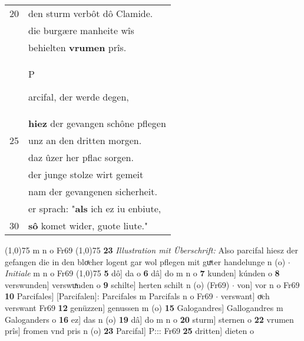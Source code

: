 \documentclass[8pt,a4paper,notitlepage]{article}
\begin{document}
\begin{table}[ht]
\begin{minipage}[t]{0.5\linewidth}
\begin{tabular}{rl}
20 & den sturm verbôt dô Clamide.\\ 
 & die burgære manheite wîs\\ 
 & behielten \textbf{vrumen} prîs.\\ 
 & \begin{large}P\end{large}arcifal, der werde degen,\\ 
 & \textbf{hiez} der gevangen schône pflegen\\ 
25 & unz an den dritten morgen.\\ 
 & daz ûzer her pflac sorgen.\\ 
 & der junge stolze wirt gemeit\\ 
 & nam der gevangenen sicherheit.\\ 
 & er sprach: "\textbf{als} ich ez iu enbiute,\\ 
30 & \textbf{sô} komet wider, guote liute."\\ 
\end{tabular}
\scriptsize
\line(1,0){75} \newline
m n o Fr69 \newline
\line(1,0){75} \newline
\textbf{23} \textit{Illustration mit Überschrift:} Also parcifal hiesz der gefangen die in den bloͯcher logent gar wol pflegen mit guͯter handelunge n (o)   $\cdot$ \textit{Initiale} m n o Fr69  \newline
\line(1,0){75} \newline
\textbf{5} dô] da o \textbf{6} dâ] do m n o \textbf{7} kunden] kúnden o \textbf{8} verswunden] verswuͯnden o \textbf{9} schilte] herten schilt n (o) (Fr69)  $\cdot$ von] vor n o Fr69 \textbf{10} Parcifales] [Parcifalen]: Parcifales m Parcifals n o Fr69  $\cdot$ verswant] oͮch verswant Fr69 \textbf{12} genüzzen] genussen m (o) \textbf{15} Galogandres] Gallogandres m Galoganders o \textbf{16} ez] das n (o) \textbf{19} dâ] do m n o \textbf{20} sturm] sternen o \textbf{22} vrumen prîs] fromen vnd pris n (o) \textbf{23} Parcifal] P::: Fr69 \textbf{25} dritten] dieten o \newline
\end{minipage}
\end{table}
\newpage
\end{document}
